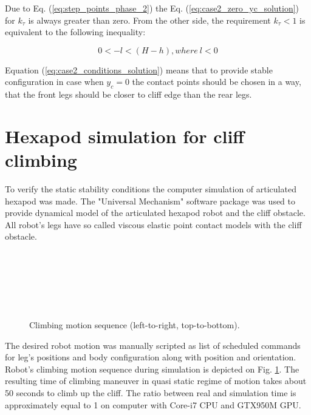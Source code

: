 \documentclass{ws-procs9x6}
\begin{document}
Due to Eq. (\ref{eq:step_points_phase_2}) the Eq. (\ref{eq:case2_zero_yc_solution}) for $k_\tau$ is always greater than zero. From the other side, the requirement $k_\tau<1$ is equivalent to the following inequality:

\begin{equation}
\label{eq:case2_conditions_solution}
  0<-l<(H-h),where~l<0
\end{equation}

Equation (\ref{eq:case2_conditions_solution}) means that to provide stable configuration in case when $y_c=0$ the contact points should be chosen in a way, that the front legs should be closer to cliff edge than the rear legs.


\section{Hexapod simulation for cliff climbing}
To verify the static stability conditions the computer simulation of articulated hexapod was made.  The "Universal Mechanism"\cite{um} software package was used to provide dynamical model of the articulated hexapod robot and the cliff obstacle. All robot's legs have so called viscous elastic point contact models with the cliff obstacle.

\begin{figure}
  \centering
  \\
  \\
  \\
  \\
  \\
  \caption{Climbing motion sequence (left-to-right, top-to-bottom).
    \label{kinogramm}}
\end{figure}

The desired robot motion was manually scripted as list of scheduled commands for leg's positions and body configuration along with position and orientation. Robot's climbing motion sequence during simulation is depicted on Fig. \ref{kinogramm}. The resulting time of climbing maneuver in quasi static regime of motion takes about 50 seconds to climb up the cliff. The ratio between real and simulation time is approximately equal to 1 on computer with Core-i7 CPU and GTX950M GPU.
\end{document}
